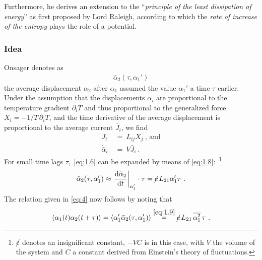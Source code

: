\documentclass[a4paper]{article}
\renewcommand{\d}{\text{d}}
\newcommand\mean[1]{\mathop{\overline{#1}}}
\renewcommand{\c}{\cancel{c}}
\begin{document}
\noindent Furthermore, he derives an extension to the ``\emph{principle of the least dissipation of energy}'' as first proposed by Lord Raleigh, according to which the \emph{rate of increase of the entropy} plays the role of a potential.

\subsubsection*{Idea}
Onsager denotes as
\begin{align}
    \bar{\alpha}_2 (\tau, \alpha_1')
    \label{eq:1.6}
\end{align}
the average displacement $\alpha_2$ after $\alpha_1$ assumed the value $\alpha_1'$ a time $\tau$ earlier. Under the assumption that the displacements $\alpha_i$ are proportional to the temperature gradient $\partial_i T$ and thus proportional to the generalized force 
$X_i = -1/T \, \partial_i T$, and the time derivative of the average displacement is proportional to the average current $\bar{J}_i$, we find
\begin{align}
    J_i &~=~ L_{ij} X_j ~\text{, and} \label{eq:1.7} \\
    \dot{\bar \alpha}_i &~=~ V \bar{J}_i~. \label{eq:1.8}
\end{align}
For small time lags $\tau$,~\eqref{eq:1.6} can be expanded by means of \eqref{eq:1.8}:~\footnote{$\c$ denotes an insignificant constant, $-VC$ is in this case, with $V$ the volume of the system and $C$ a constant derived from Einstein's theory of fluctuations.}
\begin{align}
    \bar \alpha_2 (\tau, \alpha_1') 
    \approx \left.\frac{\d \bar \alpha_2}{\d t}\right\vert_{\alpha_1'} \cdot \tau
    = \c\, L_{21} \alpha_1' \tau~.
    \label{eq:1.9}
\end{align}
The relation given in \eqref{eq:4} now follows by noting that
\begin{align}
    \langle \alpha_1 (t) \alpha_2 (t + \tau) \rangle 
    = \langle \alpha_1' \bar \alpha_2 (\tau, \alpha_1') \rangle
    \stackrel{\eqref{eq:1.9}}{=} \c\, L_{21} \mean{\alpha_1^2} \tau~.
    \label{eq:1.10}
\end{align}

\newpage
\end{document}
